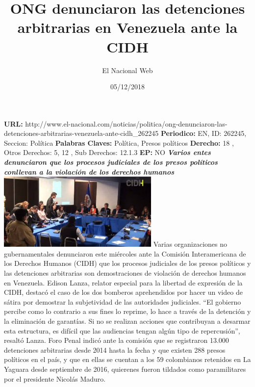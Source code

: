 \documentclass{article}%
\title{\textbf{ONG denunciaron las detenciones arbitrarias en Venezuela ante la CIDH}}%
\author{El Nacional Web}%
\date{05/12/2018}%
\begin{document}
%
\normalsize%
\maketitle%
\textbf{URL: }%
http://www.el{-}nacional.com/noticias/politica/ong{-}denunciaron{-}las{-}detenciones{-}arbitrarias{-}venezuela{-}ante{-}cidh\_262245\newline%
%
\textbf{Periodico: }%
EN, %
ID: %
262245, %
Seccion: %
Política\newline%
%
\textbf{Palabras Claves: }%
Política, Presos políticos\newline%
%
\textbf{Derecho: }%
18%
, Otros Derechos: %
5, 12%
, Sub Derechos: %
12.1.3%
\newline%
%
\textbf{EP: }%
NO\newline%
\newline%
%
\textbf{\textit{Varios entes denunciaron que los procesos judiciales de los presos políticos conllevan a la violación de los derechos humanos~}}%
\newline%
\newline%
%
\includegraphics[width=300px]{27.jpg}%
\newline%
%
Varias organizaciones no gubernamentales denunciaron este miércoles ante la Comisión Interamericana de los Derechos Humanos (CIDH) que los procesos judiciales de los presos políticos y las detenciones arbitrarias son demostraciones de violación de derechos humanos en Venezuela.%
\newline%
%
Edison Lanza, relator especial para la libertad de expresión de la CIDH, destacó el caso de los dos bomberos aprehendidos por hacer un video de sátira por demostrar la subjetividad de las autoridades judiciales.%
\newline%
%
“El gobierno percibe como lo contrario a sus fines lo reprime, lo hace a través de la detención y la eliminación de garantías. Si no se realizan acciones que contribuyan a desarmar esta estructura, es difícil que las audiencias tengan algún tipo de repercusión”, resaltó Lanza.%
\newline%
%
Foro Penal indicó ante la comisión que se registraron 13.000 detenciones arbitrarias desde 2014 hasta la fecha y que existen 288 presos políticos en el país, y que en ellas se cuentan a los 59 colombianos retenidos en La Yaguara desde septiembre de 2016, quierenes fueron tildados como paramilitares por el presidente Nicolás Maduro.%
\end{document}
